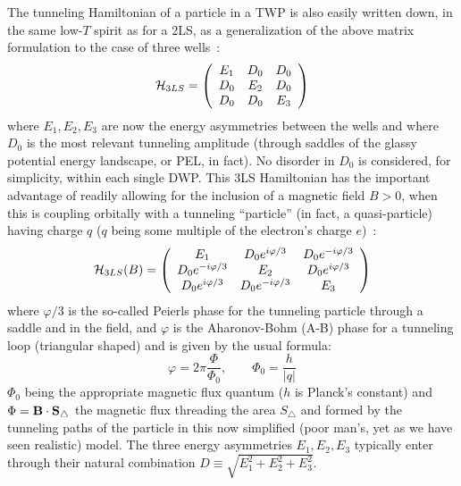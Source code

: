 \documentclass[10pt]{article}
\begin{document}
The tunneling Hamiltonian of a particle in a TWP is also easily written down, in 
the same low-$T$ spirit as for a 2LS, as a generalization of the above matrix 
formulation to the case of three wells~\cite{Jug2004}:
\begin{equation}
{\cal H}_{3LS}=\left( \begin{array}{ccc}
E_1 & D_0 & D_0 \cr
D_0 & E_2 & D_0 \cr
D_0 & D_0 & E_3 \end{array} \right)
\label{3lstunneling}
\end{equation}
where $E_1, E_2, E_3$ are now the energy asymmetries between the wells and 
where $D_0$ is the most relevant tunneling amplitude (through saddles of the 
glassy potential energy landscape, or PEL, in fact). No disorder in $D_0$ is 
considered, for simplicity, within each single DWP.
This 3LS Hamiltonian has the important advantage of readily allowing for the 
inclusion of a magnetic field $B>0$, when this is coupling orbitally with a 
tunneling ``particle'' (in fact, a quasi-particle) having charge $q$ ($q$ being 
some multiple of the electron's charge $e$)~\cite{Jug2004}:
\begin{equation}
{\cal H}_{3LS}(B)=\left( \begin{array}{ccc}
E_1 & D_0e^{i\varphi/3} & D_0e^{-i\varphi/3} \cr
D_0e^{-i\varphi/3} & E_2 & D_0e^{i\varphi/3} \cr
D_0e^{i\varphi/3} & D_0e^{-i\varphi/3} & E_3 \end{array} \right)
\label{3lsmagtunneling}
\end{equation}
where $\varphi/3$ is the so-called Peierls phase for the tunneling particle 
through a saddle and in the field, and $\varphi$ is the Aharonov-Bohm (A-B) 
phase for a tunneling loop (triangular shaped) and is given by the usual formula:
\begin{equation}
\varphi=2\pi\frac{\Phi}{\Phi_0}, \qquad \Phi_0=\frac{h}{\vert q\vert}
\label{ABphase}
\end{equation}
$\Phi_0$ being the appropriate magnetic flux quantum ($h$ is Planck's constant) 
and $\Phi={\bf B}\cdot{\bf S}_{\triangle}$ the magnetic flux threading the area 
$S_{\triangle}$ and formed by the tunneling paths of the particle in this now 
simplified (poor man's, yet as we have seen realistic) model. The three energy
asymmetries $E_1, E_2, E_3$ typically enter through their natural combination
$D\equiv\sqrt{E_1^2+E_2^2+E_3^2}$. 
\end{document}
